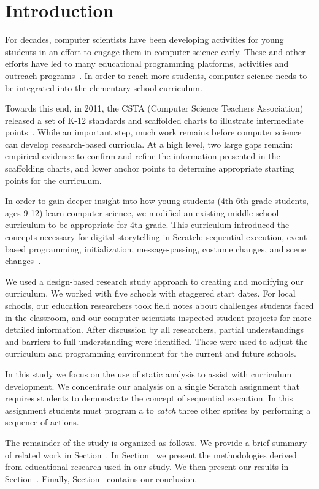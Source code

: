 \section{Introduction}
For decades, computer scientists have been developing activities for young
students in an effort to engage them in computer science early. These and other
efforts have led to many educational programming platforms, activities and
outreach programs~\cite{wayanoutpost, georgiaoutreach,
Franklin:2011:ATA:1953163.1953295, Maloney:2010:SPL:1868358.1868363,
Dann:2000:MCP:343048.343070, Hood:2005:TPL:1067445.1067454, csunplugged}. In
order to reach more students, computer science needs to be integrated into the
elementary school curriculum.

Towards this end, in 2011, the CSTA (Computer Science Teachers Association)
released a set of K-12 standards and scaffolded charts to illustrate
intermediate points~\cite{cstastandards}. While an important step, much work
remains before computer science can develop research-based curricula. At a
high level, two large gaps remain: empirical evidence to confirm and refine the
information presented in the scaffolding charts, and lower anchor points to
determine appropriate starting points for the curriculum.

In order to gain deeper insight into how young students (4th-6th grade
students, ages 9-12) learn computer science, we modified an existing
middle-school curriculum to be appropriate for 4th grade. This curriculum
introduced the concepts necessary for digital storytelling in Scratch:
sequential execution, event-based programming, initialization, message-passing,
costume changes, and scene changes~\cite{Franklin:2013:SBO}.

We used a design-based research study approach to creating and modifying our
curriculum. We worked with five schools with staggered start dates. For local
schools, our education researchers took field notes about challenges students
faced in the classroom, and our computer scientists inspected student projects
for more detailed information. After discussion by all researchers, partial
understandings and barriers to full understanding were identified. These were
used to adjust the curriculum and programming environment for the current and
future schools.

In this study we focus on the use of static analysis to assist with curriculum
development. We concentrate our analysis on a single Scratch assignment that
requires students to demonstrate the concept of sequential execution. In this
assignment students must program a \net{} to \emph{catch} three other sprites
by performing a sequence of actions.

The remainder of the study is organized as follows. We provide a brief summary
of related work in Section~. In
Section~ we present the methodologies derived from
educational research used in our study. We then present our results in
Section~. Finally, Section~
contains our conclusion.
